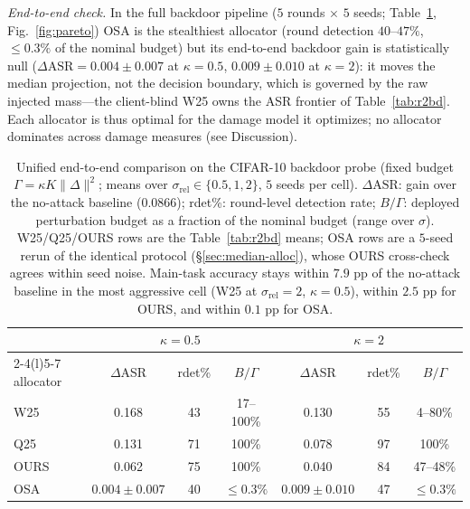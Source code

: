 \documentclass[final,1p,times]{elsarticle}
\begin{document}
\emph{End-to-end check.} In the full backdoor pipeline ($5$ rounds
$\times$ $5$ seeds; Table~\ref{tab:osae2e}, Fig.~\ref{fig:pareto}) OSA
is the stealthiest allocator (round detection $40$--$47\%$, $\le0.3\%$
of the nominal budget) but its end-to-end backdoor gain is statistically
null ($\Delta\mathrm{ASR}=0.004\pm0.007$ at $\kappa{=}0.5$,
$0.009\pm0.010$ at $\kappa{=}2$): it moves the median projection, not
the decision boundary, which is governed by the raw injected mass---the
client-blind W25 owns the ASR frontier of Table~\ref{tab:r2bd}. Each
allocator is thus optimal for the damage model it optimizes; no
allocator dominates across damage measures (see Discussion).

\begin{table}[!t]
\centering
\caption{Unified end-to-end comparison on the CIFAR-10 backdoor probe
(fixed budget $\Gamma=\kappa K\|\Delta\|^{2}$; means over
$\sigma_{\mathrm{rel}}{\in}\{0.5,1,2\}$, $5$ seeds per cell).
$\Delta\mathrm{ASR}$: gain over the no-attack baseline ($0.0866$);
rdet\%: round-level detection rate; $B/\Gamma$: deployed perturbation
budget as a fraction of the nominal budget (range over $\sigma$).
W25/Q25/OURS rows are the Table~\ref{tab:r2bd} means; OSA rows are a
$5$-seed rerun of the identical protocol (\S\ref{sec:median-alloc}),
whose OURS cross-check agrees within seed noise. Main-task accuracy
stays within $7.9$ pp of the no-attack baseline in the most aggressive
cell (W25 at $\sigma_{\mathrm{rel}}{=}2$, $\kappa{=}0.5$), within
$2.5$ pp for OURS, and within $0.1$ pp for OSA.}
\label{tab:osae2e}
\footnotesize\setlength{\tabcolsep}{4pt}
\begin{tabular}{lcccccc}
\toprule
& \multicolumn{3}{c}{$\kappa{=}0.5$} & \multicolumn{3}{c}{$\kappa{=}2$} \\
\cmidrule(r){2-4}\cmidrule(l){5-7}
allocator & $\Delta$ASR & rdet\% & $B/\Gamma$ & $\Delta$ASR & rdet\% & $B/\Gamma$ \\
\midrule
W25  & 0.168 & 43 & 17--100\% & 0.130 & 55 & 4--80\% \\
Q25  & 0.131 & 71 & 100\%     & 0.078 & 97 & 100\% \\
OURS & 0.062 & 75 & 100\%     & 0.040 & 84 & 47--48\% \\
OSA  & $0.004{\pm}0.007$ & 40 & $\le0.3\%$ & $0.009{\pm}0.010$ & 47 & $\le0.3\%$ \\
\bottomrule
\end{tabular}
\end{table}

\end{document}
